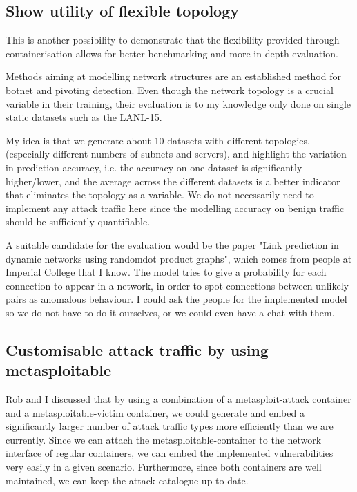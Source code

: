\documentclass{article}
\begin{document}
\subsection{Show utility of flexible topology}

This is another possibility to demonstrate that the flexibility provided through containerisation allows for better benchmarking and more in-depth evaluation.

Methods aiming at modelling network structures are an established method for botnet and pivoting detection. Even though the network topology is a crucial variable in their training, their evaluation is to my knowledge only done on single static datasets such as the LANL-15. 

My idea is that we generate about 10 datasets with different topologies, (especially different numbers of subnets and servers), and highlight the variation in prediction accuracy, i.e. the accuracy on one dataset is significantly higher/lower, and the average across the different datasets is a better indicator that eliminates the topology as a variable. We do not necessarily need to implement any attack traffic here since the modelling accuracy on benign traffic should be sufficiently quantifiable. 

A suitable candidate for the evaluation would be the paper "Link prediction in dynamic networks using randomdot product graphs", which comes from people at Imperial College that I know. The model tries to give a probability for each connection to appear in a network, in order to spot connections between unlikely pairs as anomalous behaviour. I could ask the people for the implemented model so we do not have to do it ourselves, or we could even have a chat with them.



\subsection{Customisable attack traffic by using metasploitable}

Rob and I discussed that by using a combination of a metasploit-attack container and a metasploitable-victim container, we could generate and embed a significantly larger number of attack traffic types more efficiently than we are currently. Since we can attach the metasploitable-container to the network interface of regular containers, we can embed the implemented vulnerabilities very easily in a given scenario. Furthermore, since both containers are well maintained, we can keep the attack catalogue up-to-date.
\end{document}
